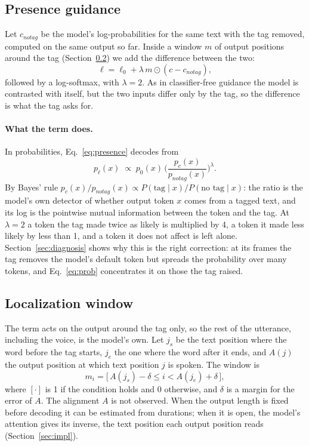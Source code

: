 \documentclass[11pt]{article}
\newcommand{\nt}{\textit{notag}}
\begin{document}
\subsection{Presence guidance}
\label{sec:presence}
Let $c_{\nt}$ be the model's log-probabilities for the same text with the tag removed, computed on the same output so far. Inside a window $m$ of output positions around the tag (Section~\ref{sec:window}) we add the difference between the two:
\begin{equation}
\ell = \ell_0 + \lambda\, m \odot (c - c_{\nt}),
\label{eq:presence}
\end{equation}
followed by a log-softmax, with $\lambda = 2$. As in classifier-free guidance the model is contrasted with itself, but the two inputs differ only by the tag, so the difference is what the tag asks for.

\paragraph{What the term does.} In probabilities, Eq.~\eqref{eq:presence} decodes from
\begin{equation}
p_\ell(x) \;\propto\; p_0(x)\,\Big(\frac{p_c(x)}{p_{\nt}(x)}\Big)^{\lambda}.
\label{eq:prob}
\end{equation}
By Bayes' rule $p_c(x)/p_{\nt}(x) \propto P(\text{tag}\mid x)/P(\text{no tag}\mid x)$: the ratio is the model's own detector of whether output token $x$ comes from a tagged text, and its log is the pointwise mutual information between the token and the tag. At $\lambda = 2$ a token the tag made twice as likely is multiplied by 4, a token it made less likely by less than 1, and a token it does not affect is left alone. Section~\ref{sec:diagnosis} shows why this is the right correction: at its frames the tag removes the model's default token but spreads the probability over many tokens, and Eq.~\eqref{eq:prob} concentrates it on those the tag raised.

\subsection{Localization window}
\label{sec:window}
The term acts on the output around the tag only, so the rest of the utterance, including the voice, is the model's own. Let $j_s$ be the text position where the word before the tag starts, $j_e$ the one where the word after it ends, and $A(j)$ the output position at which text position $j$ is spoken. The window is
\begin{equation}
m_i = \big[\,A(j_s) - \delta \le i < A(j_e) + \delta\,\big],
\label{eq:window}
\end{equation}
where $[\cdot]$ is 1 if the condition holds and 0 otherwise, and $\delta$ is a margin for the error of $A$. The alignment $A$ is not observed. When the output length is fixed before decoding it can be estimated from durations; when it is open, the model's attention gives its inverse, the text position each output position reads (Section~\ref{sec:impl}).
\end{document}
